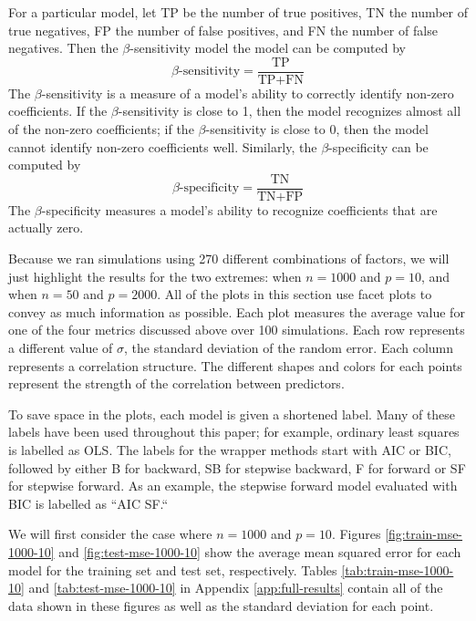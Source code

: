 \documentclass{article}
\begin{document}
For a particular model, let TP be the number of true positives, TN the number of true negatives, FP the number of false positives, and FN the number of false negatives. Then the $\beta$-sensitivity model the model can be computed by
\begin{equation}
	\beta\text{-sensitivity} = \frac{\text{TP}}{\text{TP} + \text{FN}}
\end{equation}
The $\beta$-sensitivity is a measure of a model's ability to correctly identify non-zero coefficients. If the $\beta$-sensitivity is close to 1, then the model recognizes almost all of the non-zero coefficients; if the $\beta$-sensitivity is close to 0, then the model cannot identify non-zero coefficients well. Similarly, the $\beta$-specificity can be computed by
\begin{equation}
	\beta\text{-specificity} = \frac{\text{TN}}{\text{TN} + \text{FP}}
\end{equation}
The $\beta$-specificity measures a model's ability to recognize coefficients that are actually zero.


Because we ran simulations using 270 different combinations of factors, we will just highlight the results for the two extremes: when $n = 1000$ and $p = 10$, and when $n = 50$ and $p = 2000$. All of the plots in this section use facet plots to convey as much information as possible. Each plot measures the average value for one of the four metrics discussed above over 100 simulations. Each row represents a different value of $\sigma$, the standard deviation of the random error. Each column represents a correlation structure. The different shapes and colors for each points represent the strength of the correlation between predictors.

To save space in the plots, each model is given a shortened label. Many of these labels have been used throughout this paper; for example, ordinary least squares is labelled as OLS. The labels for the wrapper methods start with AIC or BIC, followed by either B for backward, SB for stepwise backward, F for forward or SF for stepwise forward. As an example, the stepwise forward model evaluated with BIC is labelled as ``AIC SF.``

We will first consider the case where $n = 1000$ and $p = 10$. Figures \ref{fig:train-mse-1000-10} and \ref{fig:test-mse-1000-10} show the average mean squared error for each model for the training set and test set, respectively. Tables \ref{tab:train-mse-1000-10} and \ref{tab:test-mse-1000-10} in Appendix \ref{app:full-results} contain all of the data shown in these figures as well as the standard deviation for each point.
\end{document}
